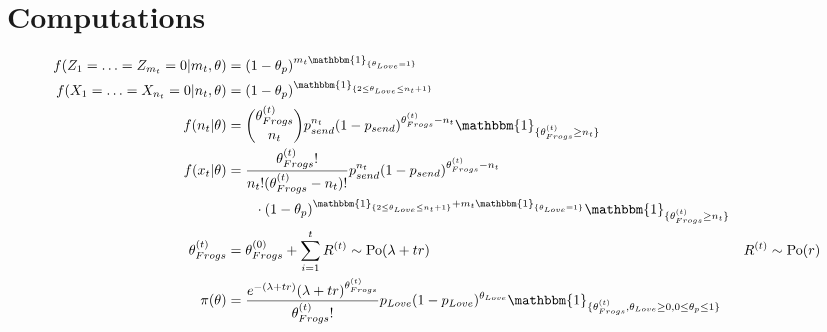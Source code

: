 \documentclass[10pt, a4paper]{article}
\begin{document}
    \section{Computations}
    \begin{align*}
        f(Z_1 = \ldots = Z_{m_t} = 0|m_t, \theta)
        &= (1-\theta_p)^{m_t\mathbbm{1}_{\{\theta_{Love} = 1\}}} \\
        f(X_1 = \ldots = X_{n_t} = 0|n_t, \theta)
        &= (1-\theta_p)^{\mathbbm{1}_{\{2\leq\theta_{Love}\leq n_t+1\}}} \\
        f(n_t|\theta) 
        &= \binom{\theta_{Frogs}^{(t)}}{n_t}p_{send}^{n_t}(1-p_{send})^{\theta_{Frogs}^{(t)}-n_t} \mathbbm{1}_{\{\theta_{Frogs}^{(t)}\geq n_t\}} \\
        f(x_t|\theta)
        &= \frac{\theta_{Frogs}^{(t)}!}{n_t!(\theta_{Frogs}^{(t)}-n_t)!}p_{send}^{n_t}(1-p_{send})^{\theta_{Frogs}^{(t)}-n_t} \\&\qquad\cdot (1-\theta_p)^{\mathbbm{1}_{\{2\leq\theta_{Love}\leq n_t+1\}} + m_t\mathbbm{1}_{\{\theta_{Love} = 1\}}} \mathbbm{1}_{\{\theta_{Frogs}^{(t)}\geq n_t\}} \\
        \theta_{Frogs}^{(t)} 
        &= \theta_{Frogs}^{(0)} + \sum_{i=1}^{t} R^{(t)} \sim \mathrm{Po}(\lambda+tr) & R^{(t)} \sim \mathrm{Po}(r) \\
        \pi(\theta)
        &= \frac{e^{-(\lambda+tr)}(\lambda+tr)^{\theta_{Frogs}^{(t)}}}{\theta_{Frogs}^{(t)}!}p_{Love}(1-p_{Love})^{\theta_{Love}} \mathbbm{1}_{\{\theta_{Frogs}^{(t)}, \theta_{Love}\geq 0, 0 \leq \theta_p \leq 1\}}
    \end{align*}
\end{document}
